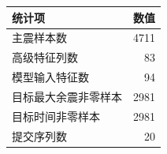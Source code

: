 \begingroup
\footnotesize
\setlength{\tabcolsep}{4pt}
\begin{tabular}{lr}
\toprule
统计项 & 数值 \\
\midrule
主震样本数 & 4711 \\
高级特征列数 & 83 \\
模型输入特征数 & 94 \\
目标最大余震非零样本 & 2981 \\
目标时间非零样本 & 2981 \\
提交序列数 & 20 \\
\bottomrule
\end{tabular}
\endgroup
